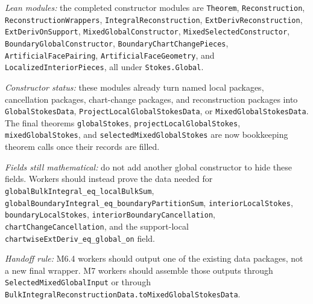 \begin{definition}
  \label{anc:m6_4_completed_constructor_layer}
  \leanok
  \emph{Lean modules:}
  the completed constructor modules are
  \texttt{Theorem}, \texttt{Reconstruction},
  \texttt{ReconstructionWrappers}, \texttt{IntegralReconstruction},
  \texttt{ExtDerivReconstruction}, \texttt{ExtDerivOnSupport},
  \texttt{MixedGlobalConstructor}, \texttt{MixedSelectedConstructor},
  \texttt{BoundaryGlobalConstructor}, \texttt{BoundaryChartChangePieces},
  \texttt{ArtificialFacePairing}, \texttt{ArtificialFaceGeometry}, and
  \texttt{LocalizedInteriorPieces}, all under \texttt{Stokes.Global}.

  \emph{Constructor status:}
  these modules already turn named local packages, cancellation packages,
  chart-change packages, and reconstruction packages into
  \texttt{GlobalStokesData}, \texttt{ProjectLocalGlobalStokesData}, or
  \texttt{MixedGlobalStokesData}.  The final theorems
  \texttt{globalStokes}, \texttt{projectLocalGlobalStokes},
  \texttt{mixedGlobalStokes}, and \texttt{selectedMixedGlobalStokes} are now
  bookkeeping theorem calls once their records are filled.

  \emph{Fields still mathematical:}
  do not add another global constructor to hide these fields.  Workers should
  instead prove the data needed for
  \texttt{globalBulkIntegral\_eq\_localBulkSum},
  \texttt{globalBoundaryIntegral\_eq\_boundaryPartitionSum},
  \texttt{interiorLocalStokes}, \texttt{boundaryLocalStokes},
  \texttt{interiorBoundaryCancellation},
  \texttt{chartChangeCancellation}, and the support-local
  \texttt{chartwiseExtDeriv\_eq\_global\_on} field.

  \emph{Handoff rule:}
  M6.4 workers should output one of the existing data packages, not a new
  final wrapper.  M7 workers should assemble those outputs through
  \texttt{SelectedMixedGlobalInput} or through
  \texttt{BulkIntegralReconstructionData.toMixedGlobalStokesData}.
\end{definition}

